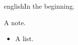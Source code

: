 \documentclass{article}
\begin{document}
\begin{mekor}
\begin{mekorlang}{english}{}In the beginning.\end{mekorlang}
\end{mekor}
\begin{hearah}A note.\end{hearah}
\begin{itemize}\item A list.\end{itemize}
\end{document}
